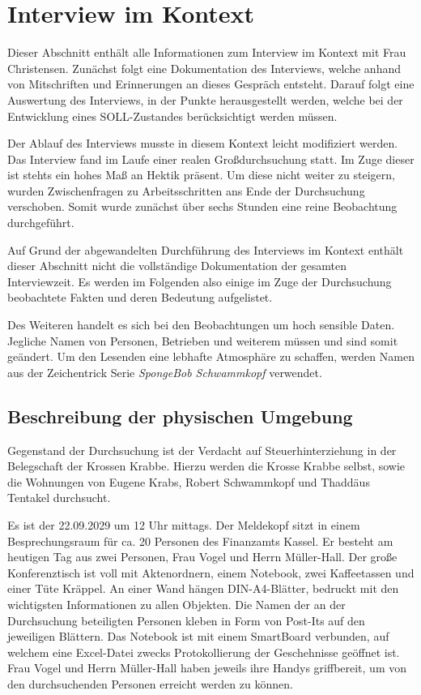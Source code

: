 \section{Interview im Kontext}\label{sec:interview-praktisch}

Dieser Abschnitt enthält alle Informationen zum Interview im Kontext mit Frau Christensen. 
Zunächst folgt eine Dokumentation des Interviews, welche anhand von Mitschriften und Erinnerungen an dieses Gespräch entsteht.
Darauf folgt eine Auswertung des Interviews, in der Punkte herausgestellt werden, welche bei der Entwicklung eines SOLL-Zustandes berücksichtigt werden müssen.

Der Ablauf des Interviews musste in diesem Kontext leicht modifiziert werden.
Das Interview fand im Laufe einer realen Großdurchsuchung statt.
Im Zuge dieser ist stehts ein hohes Maß an Hektik präsent.
Um diese nicht weiter zu steigern, wurden Zwischenfragen zu Arbeitsschritten ans Ende der Durchsuchung verschoben.
Somit wurde zunächst über sechs Stunden eine reine Beobachtung durchgeführt.

Auf Grund der abgewandelten Durchführung des Interviews im Kontext enthält dieser Abschnitt nicht die vollständige Dokumentation der gesamten Interviewzeit.
Es werden im Folgenden also einige im Zuge der Durchsuchung beobachtete Fakten und deren Bedeutung aufgelistet.

Des Weiteren handelt es sich bei den Beobachtungen um hoch sensible Daten.
Jegliche Namen von Personen, Betrieben und weiterem müssen und sind somit geändert.
Um den Lesenden eine lebhafte Atmosphäre zu schaffen, werden Namen aus der Zeichentrick Serie \textit{SpongeBob Schwammkopf} verwendet.

\subsection{Beschreibung der physischen Umgebung}

Gegenstand der Durchsuchung ist der Verdacht auf Steuerhinterziehung in der Belegschaft der Krossen Krabbe.
Hierzu werden die Krosse Krabbe selbst, sowie die Wohnungen von Eugene Krabs, Robert Schwammkopf und Thaddäus Tentakel durchsucht.

Es ist der 22.09.2029 um 12 Uhr mittags.
Der Meldekopf sitzt in einem Besprechungsraum für ca. 20 Personen des Finanzamts Kassel.
Er besteht am heutigen Tag aus zwei Personen, Frau Vogel und Herrn Müller-Hall.
Der große Konferenztisch ist voll mit Aktenordnern, einem Notebook, zwei Kaffeetassen und einer Tüte Kräppel.
An einer Wand hängen DIN-A4-Blätter, bedruckt mit den wichtigsten Informationen zu allen Objekten.
Die Namen der an der Durchsuchung beteiligten Personen kleben in Form von Post-Its auf den jeweiligen Blättern.
Das Notebook ist mit einem SmartBoard verbunden, auf welchem eine Excel-Datei zwecks Protokollierung der Geschehnisse geöffnet ist.
Frau Vogel und Herrn Müller-Hall haben jeweils ihre Handys griffbereit, um von den durchsuchenden Personen erreicht werden zu können.

